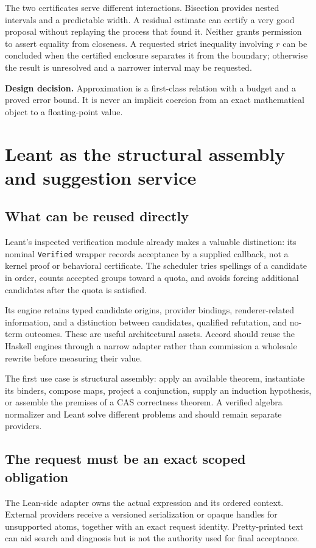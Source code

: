 \documentclass[11pt,letterpaper]{article}
\newcommand{\code}[1]{\nolinkurl{#1}}
\newcommand{\decision}[1]{\par\smallskip\textbf{Design decision.} #1\par\smallskip}
\theoremstyle{definition}
\begin{document}
The two certificates serve different interactions. Bisection provides nested
intervals and a predictable width. A residual estimate can certify a very good
proposal without replaying the process that found it. Neither grants permission
to assert equality from closeness. A requested strict inequality involving \(r\)
can be concluded when the certified enclosure separates it from the boundary;
otherwise the result is unresolved and a narrower interval may be requested.

\decision{Approximation is a first-class relation with a budget and a proved
error bound. It is never an implicit coercion from an exact mathematical object
to a floating-point value.}

\section{Leant as the structural assembly and suggestion service}\label{sec:leant}
\subsection{What can be reused directly}
Leant's inspected verification module already makes a valuable distinction:
its nominal \code{Verified} wrapper records acceptance by a supplied callback,
not a kernel proof or behavioral certificate. The scheduler tries spellings of a
candidate in order, counts accepted groups toward a quota, and avoids forcing
additional candidates after the quota is satisfied\cite{lverification}.

Its engine retains typed candidate origins, provider bindings, renderer-related
information, and a distinction between candidates, qualified refutation, and
no-term outcomes\cite{lengine}. These are useful architectural assets. Accord
should reuse the Haskell engines through a narrow adapter rather than commission
a wholesale rewrite before measuring their value.

The first use case is structural assembly: apply an available theorem, instantiate
its binders, compose maps, project a conjunction, supply an induction hypothesis,
or assemble the premises of a CAS correctness theorem. A verified algebra
normalizer and Leant solve different problems and should remain separate providers.

\subsection{The request must be an exact scoped obligation}
The Lean-side adapter owns the actual expression and its ordered context. External
providers receive a versioned serialization or opaque handles for unsupported
atoms, together with an exact request identity. Pretty-printed text can aid search
and diagnosis but is not the authority used for final acceptance.
\end{document}
